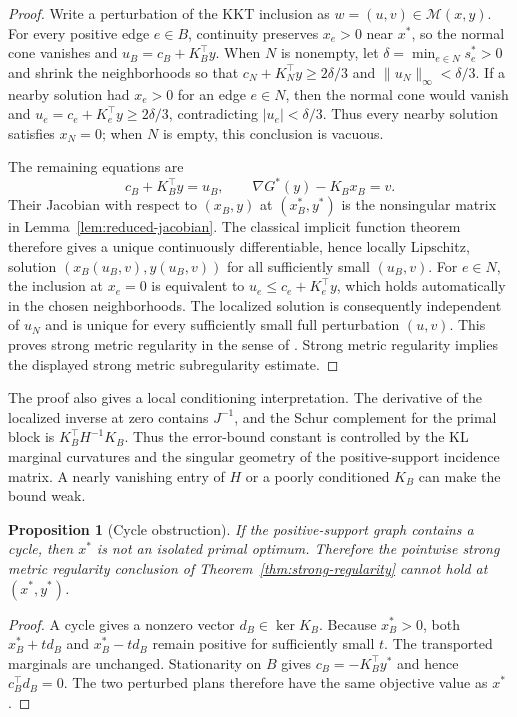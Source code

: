 \documentclass[11pt]{article}
\newtheorem{proposition}{Proposition}
\begin{document}
\begin{proof}
Write a perturbation of the KKT inclusion as $w=(u,v)\in\mathcal M(x,y)$.
For every positive edge $e\in B$, continuity preserves $x_e>0$ near $x^*$, so the normal cone vanishes and $u_B=c_B+K_B^\top y$.
When $N$ is nonempty, let $\delta=\min_{e\in N}s_e^*>0$ and shrink the neighborhoods so that $c_N+K_N^\top y\geq 2\delta/3$ and $\lVert u_N\rVert_\infty<\delta/3$.
If a nearby solution had $x_e>0$ for an edge $e\in N$, then the normal cone would vanish and $u_e=c_e+K_e^\top y\geq2\delta/3$, contradicting $|u_e|<\delta/3$.
Thus every nearby solution satisfies $x_N=0$; when $N$ is empty, this conclusion is vacuous.

The remaining equations are
$$c_B+K_B^\top y=u_B,\qquad \nabla G^*(y)-K_Bx_B=v.$$
Their Jacobian with respect to $(x_B,y)$ at $(x_B^*,y^*)$ is the nonsingular matrix in Lemma~\ref{lem:reduced-jacobian}.
The classical implicit function theorem therefore gives a unique continuously differentiable, hence locally Lipschitz, solution $(x_B(u_B,v),y(u_B,v))$ for all sufficiently small $(u_B,v)$.
For $e\in N$, the inclusion at $x_e=0$ is equivalent to $u_e\leq c_e+K_e^\top y$, which holds automatically in the chosen neighborhoods.
The localized solution is consequently independent of $u_N$ and is unique for every sufficiently small full perturbation $(u,v)$.
This proves strong metric regularity in the sense of \cite{robinson1980strongly}.
Strong metric regularity implies the displayed strong metric subregularity estimate.
\end{proof}

The proof also gives a local conditioning interpretation.
The derivative of the localized inverse at zero contains $J^{-1}$, and the Schur complement for the primal block is $K_B^\top H^{-1}K_B$.
Thus the error-bound constant is controlled by the KL marginal curvatures and the singular geometry of the positive-support incidence matrix.
A nearly vanishing entry of $H$ or a poorly conditioned $K_B$ can make the bound weak.

\begin{proposition}[Cycle obstruction]\label{prop:cycle-obstruction}
If the positive-support graph contains a cycle, then $x^*$ is not an isolated primal optimum.
Therefore the pointwise strong metric regularity conclusion of Theorem~\ref{thm:strong-regularity} cannot hold at $(x^*,y^*)$.
\end{proposition}

\begin{proof}
A cycle gives a nonzero vector $d_B\in\ker K_B$.
Because $x_B^*>0$, both $x_B^*+td_B$ and $x_B^*-td_B$ remain positive for sufficiently small $t$.
The transported marginals are unchanged.
Stationarity on $B$ gives $c_B=-K_B^\top y^*$ and hence $c_B^\top d_B=0$.
The two perturbed plans therefore have the same objective value as $x^*$.
\end{proof}
\end{document}
